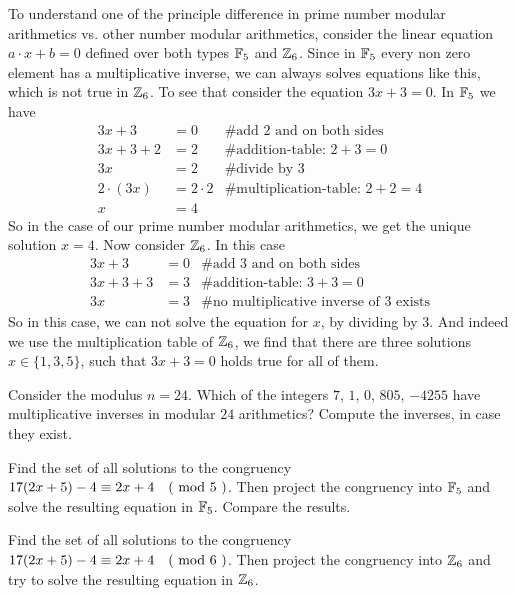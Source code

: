 \begin{example}
To understand one of the principle difference in prime number modular arithmetics vs. other number modular arithmetics, consider the linear equation $a\cdot x +b=0$ defined over both types $\mathbb{F}_5$ and $\mathbb{Z}_6$. Since in $\mathbb{F}_5$ every non zero element has a multiplicative inverse, we can always solves equations like this, which is not true in $\mathbb{Z}_6$. To see that consider the equation $3x+3=0$. In $\mathbb{F}_5$ we have
\begin{align*}
3x+3    &= 0 & \text{\# add 2 and on both sides} \\
3x+3+2  &= 2 & \text{\# addition-table: } 2+3 = 0 \\
3x      &= 2 & \text{\# divide by } 3 \\
2\cdot(3x)      &= 2\cdot 2 & \text{\# multiplication-table: } 2+2=4 \\
 x      &= 4 & 
\end{align*}
So in the case of our prime number modular arithmetics, we get the unique solution $x=4$. Now consider $\mathbb{Z}_6$. In this case 
\begin{align*}
3x+3    &= 0 & \text{\# add 3 and on both sides} \\
3x+3+3  &= 3 & \text{\# addition-table: } 3+3 = 0 \\
3x      &= 3 & \text{\# no multiplicative inverse of 3  exists}
\end{align*}
So in this case, we can not solve the equation for $x$, by dividing by $3$. And indeed we use the multiplication table of $\mathbb{Z}_6$, we find that there are three solutions $x\in\{1,3,5\}$, such that $3x+3=0$ holds true for all of them.
\end{example}
\begin{exercise}
Consider the modulus $n=24$. Which of the integers $7$, $1$, $0$, $805$, $-4255$ have multiplicative inverses in modular $24$ arithmetics? Compute the inverses, in case they exist.
\end{exercise}
\begin{exercise}
Find the set of all solutions to the congruency $17(2x+5)-4 \equiv 2x+4 \quad \text{( mod } 5 \text{ )}$. Then project the congruency into $\mathbb{F}_5$ and solve the resulting equation in $\mathbb{F}_5$. Compare the results. 
\end{exercise}
\begin{exercise}
Find the set of all solutions to the congruency $17(2x+5)-4 \equiv 2x+4 \quad \text{( mod } 6 \text{ )}$. Then project the congruency into $\mathbb{Z}_6$ and try to solve the resulting equation in $\mathbb{Z}_6$.
\end{exercise}
